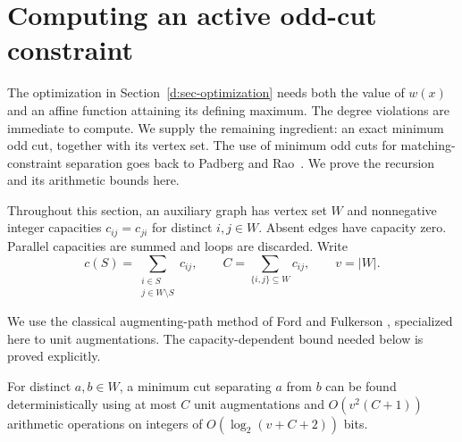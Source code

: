 \section{Computing an active odd-cut constraint}
\label{d:sec-odd-cuts}

The optimization in Section~\ref{d:sec-optimization} needs both the value of
\(w(x)\) and an affine function attaining its defining maximum.
The degree violations are immediate to compute.  We supply the remaining
ingredient: an exact minimum odd cut, together with its vertex set.
The use of minimum odd cuts for matching-constraint separation goes back
to Padberg and Rao~\citep{PadbergRao1982}. We prove the recursion and its
arithmetic bounds here.

Throughout this section, an auxiliary graph has vertex set \(W\) and
nonnegative integer capacities \(c_{ij}=c_{ji}\) for distinct \(i,j\in W\).
Absent edges have capacity zero.  Parallel capacities are summed and loops
are discarded.  Write
\[
 c(S)=\sum_{\substack{i\in S\\ j\in W\setminus S}}c_{ij},
 \qquad
 C=\sum_{\{i,j\}\subseteq W}c_{ij},
 \qquad v=|W|.
\]

We use the classical augmenting-path method of Ford and Fulkerson
\citep[Section~2]{FordFulkerson1957}, specialized here to unit
augmentations. The capacity-dependent bound needed below is proved
explicitly.

\begin{lemma}
\label{d:lem-unit-mincut}
For distinct \(a,b\in W\), a minimum cut separating \(a\) from \(b\)
can be found deterministically using at most \(C\) unit augmentations
and \(O(v^2(C+1))\) arithmetic operations on integers of
\(O(\log_2(v+C+2))\) bits.
\end{lemma}

